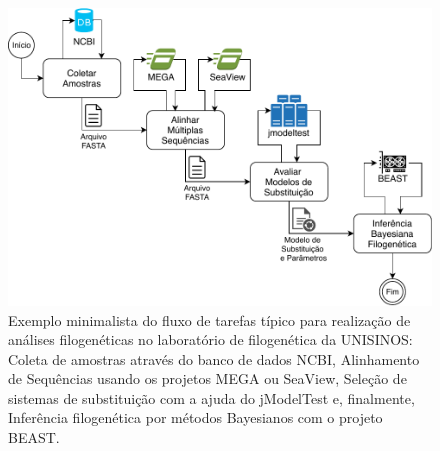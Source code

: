 \documentclass[english,brazilian]{UNISINOSmonografia} %
\newcommand\defaultFigureWidth{0.9}
\begin{document}
\begin{figure}[tb]
	\centering%
	\begin{minipage}{\defaultFigureWidth\textwidth}
		\caption[Exemplo minimalista do fluxo de tarefas típico para realização de análises filogenéticas no laboratório de filogenética da UNISINOS]{Exemplo minimalista do fluxo de tarefas típico para realização de análises filogenéticas no laboratório de filogenética da UNISINOS: Coleta de amostras através do banco de dados NCBI, Alinhamento de Sequências usando os projetos MEGA ou SeaView, Seleção de sistemas de substituição com a ajuda do jModelTest e, finalmente, Inferência filogenética por métodos Bayesianos com o projeto BEAST.}
		\label{fig:modelo-workflow-unisinos}
		\vspace{1ex}
		\includegraphics[width=\textwidth]{workflow-biologia}
	\end{minipage}
\end{figure}
\end{document}
